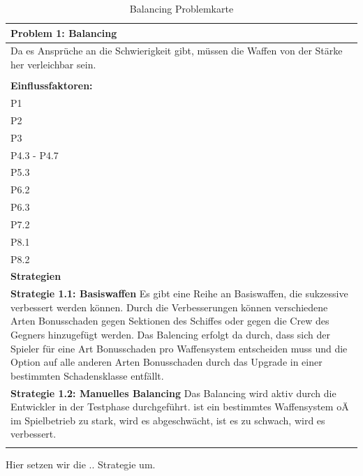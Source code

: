 \documentclass[fontsize=12pt,paper=a4,twoside]{scrartcl}
\begin{document}
\begin{table}[H]
    \centering
    \begin{tabular}{|p{15cm}|}
    \hline
          \textbf{Problem 1: Balancing}  \\ \hline
	Da es Ansprüche an die Schwierigkeit gibt, müssen die Waffen von der Stärke her verleichbar sein. \\
         \\ \hline
          \textbf{Einflussfaktoren: } \\
	P1 \\
	P2 \\
	P3 \\
	P4.3 - P4.7 \\
	P5.3 \\
	P6.2 \\
	P6.3 \\
	P7.2 \\
	P8.1 \\
	P8.2 \\
          \hline
          \textbf{Strategien} \\ \hline
            {}          
           \label{strategie:1.1}     
          \textbf{Strategie 1.1: Basiswaffen} Es gibt eine Reihe an Basiswaffen, die sukzessive verbessert werden können. Durch die Verbesserungen können verschiedene Arten Bonusschaden gegen Sektionen des Schiffes oder gegen die Crew des Gegners hinzugefügt werden. Das Balencing erfolgt da durch, dass sich der Spieler für eine Art Bonusschaden pro Waffensystem entscheiden muss und die Option auf alle anderen Arten Bonusschaden durch das Upgrade in einer bestimmten Schadensklasse entfällt. \\        
  {}          
           \label{strategie:1.2}              
          \textbf{Strategie 1.2: Manuelles Balancing} Das Balancing wird aktiv durch die Entwickler in der Testphase durchgeführt. ist ein bestimmtes Waffensystem oÄ im Spielbetrieb zu stark, wird es abgeschwächt, ist es zu schwach, wird es verbessert.  \\
	 \\ \hline
    \end{tabular}

    \caption{Balancing Problemkarte}
    \label{tab:ProblemKarte24}
\end{table}
Hier setzen wir die .. Strategie um. \\
\end{document}
